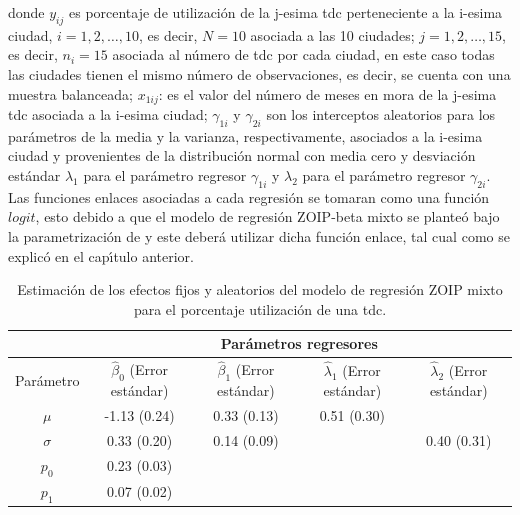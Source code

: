 donde $y_{ij}$ es porcentaje de utilizaci\'{o}n de la j-esima tdc perteneciente a la i-esima ciudad, $i=1,2,\ldots, 10$, es decir, $N=10$ asociada a las 10 ciudades; $j=1,2,\ldots, 15$, es decir, $n_i=15$ asociada al n\'{u}mero de tdc por cada ciudad, en este caso todas las ciudades tienen el mismo n\'{u}mero de observaciones, es decir, se cuenta con una muestra balanceada; $x_{1ij}$: es el valor del n\'{u}mero de meses en mora de la j-esima tdc asociada a la i-esima ciudad; $\gamma_{1i}$ y $\gamma_{2i}$ son los interceptos aleatorios para los par\'{a}metros de la media y la varianza, respectivamente, asociados a la i-esima ciudad y provenientes de la distribuci\'{o}n normal con media cero y desviaci\'{o}n est\'{a}ndar $\lambda_1$ para el par\'{a}metro regresor $\gamma_{1i}$ y $\lambda_2$ para el par\'{a}metro regresor $\gamma_{2i}$. Las funciones enlaces asociadas a cada regresi\'{o}n se tomaran como una funci\'{o}n $logit$, esto debido a que el modelo de regresi\'{o}n ZOIP-beta mixto se plante\'{o} bajo la parametrizaci\'{o}n de \cite{Stasinopoulos2} y este deber\'{a} utilizar dicha funci\'{o}n enlace, tal cual como se explic\'{o} en el cap\'{\i}tulo anterior.\\


\begin{table}[!hbt]
{\scriptsize
\begin{center}
\begin{tabular}{|c|c|c|c|c|}\hline
& \multicolumn{4}{|c|}{Par\'{a}metros regresores} \\ \hline
Par\'{a}metro & $\hat{\beta}_0$ (Error est\'{a}ndar)&  $\hat{\beta}_1$ (Error est\'{a}ndar) & $\hat{\lambda}_1$ (Error est\'{a}ndar)& $\hat{\lambda}_2$ (Error est\'{a}ndar) \\ \hline
$\mu$ & -1.13 (0.24)	&0.33	(0.13)&0.51 (0.30)& \\ \hline
$\sigma$ & 0.33	(0.20)&0.14	(0.09)&	&0.40 (0.31) \\ \hline
$p_0$ & 0.23 (0.03)& & & \\ \hline
$p_1$ & 0.07 (0.02)& & & \\ \hline
\end{tabular}
\caption{Estimaci\'{o}n de los efectos fijos y aleatorios del modelo de regresi\'{o}n ZOIP mixto para el porcentaje utilizaci\'{o}n de una tdc.}
\label{T_Apli_mix}
\end{center}
}
\end{table}

